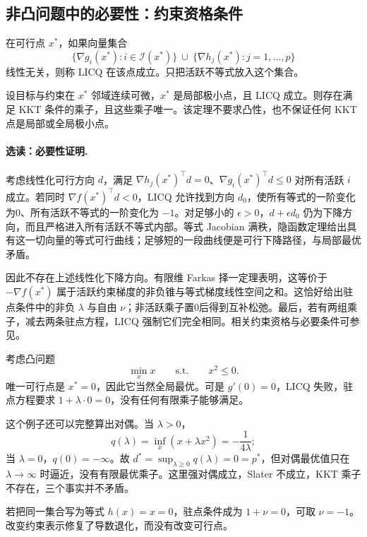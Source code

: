 \subsection{非凸问题中的必要性：约束资格条件}

\begin{definition}
在可行点 $x^*$，如果向量集合
\[
 \{\nabla g_i(x^*):i\in\mathcal I(x^*)\}
 \ \cup\ \{\nabla h_j(x^*):j=1,\ldots,p\}
\]
线性无关，则称 LICQ 在该点成立。只把活跃不等式放入这个集合。
\end{definition}

\begin{theorem}
\label{l2:thm-licq}
设目标与约束在 $x^*$ 邻域连续可微，$x^*$ 是局部极小点，且 LICQ 成立。则存在满足 KKT 条件的乘子，且这些乘子唯一。该定理不要求凸性，也不保证任何 KKT 点是局部或全局极小点。
\end{theorem}

\paragraph{选读：必要性证明.}
考虑线性化可行方向 $d$，满足 $\nabla h_j(x^*)^\top d=0$、$\nabla g_i(x^*)^\top d\leq0$ 对所有活跃 $i$ 成立。若同时 $\nabla f(x^*)^\top d<0$，LICQ 允许找到方向 $d_0$，使所有等式的一阶变化为0、所有活跃不等式的一阶变化为 $-1$。对足够小的 $\epsilon>0$，$d+\epsilon d_0$ 仍为下降方向，而且严格进入所有活跃不等式内部。等式 Jacobian 满秩，隐函数定理给出具有这一切向量的等式可行曲线；足够短的一段曲线便是可行下降路径，与局部最优矛盾。

因此不存在上述线性化下降方向。有限维 Farkas 择一定理表明，这等价于 $-\nabla f(x^*)$ 属于活跃约束梯度的非负锥与等式梯度线性空间之和。这恰好给出驻点条件中的非负 $\lambda$ 与自由 $\nu$；非活跃乘子置0后得到互补松弛。最后，若有两组乘子，减去两条驻点方程，LICQ 强制它们完全相同。相关约束资格与必要条件可参见\citet{Nocedal2006}。

\begin{example}
\label{l2:ex-licq-failure}
考虑凸问题
\[
 \min_x x\qquad\text{s.t.}\qquad x^2\leq0.
\]
唯一可行点是 $x^*=0$，因此它当然全局最优。可是 $g'(0)=0$，LICQ 失败，驻点方程要求 $1+\lambda\cdot0=0$，没有任何有限乘子能够满足。

这个例子还可以完整算出对偶。当 $\lambda>0$，
\[
 q(\lambda)=\inf_x(x+\lambda x^2)=-\frac1{4\lambda};
\]
当 $\lambda=0$，$q(0)=-\infty$。故 $d^*=\sup_{\lambda\geq0}q(\lambda)=0=p^*$，但对偶最优值只在 $\lambda\to\infty$ 时逼近，没有有限最优乘子。这里强对偶成立，Slater 不成立，KKT 乘子不存在，三个事实并不矛盾。

若把同一集合写为等式 $h(x)=x=0$，驻点条件成为 $1+\nu=0$，可取 $\nu=-1$。改变约束表示修复了导数退化，而没有改变可行点。
\end{example}

